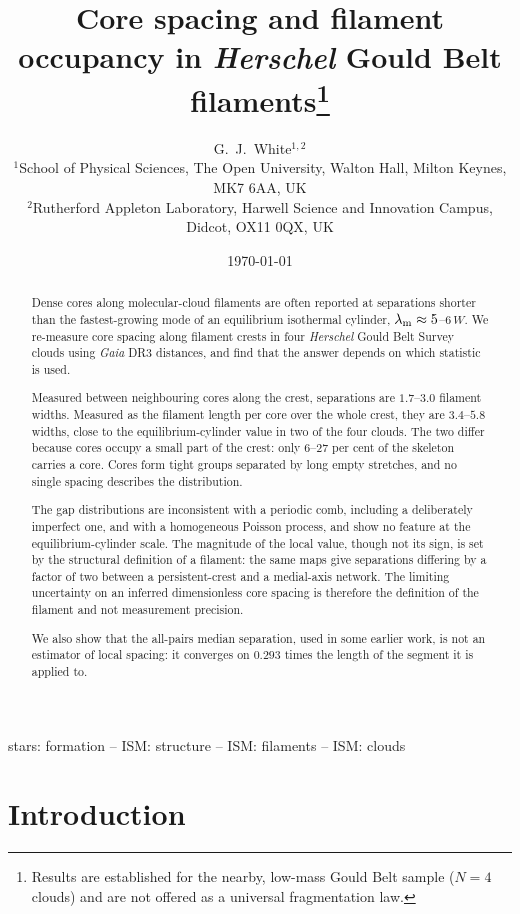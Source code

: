 \documentclass[usenatbib,twoside,twocolumn]{mnras}
\title[Core spacing and filament occupancy in HGBS filaments]{Core spacing and filament occupancy in \textit{Herschel} Gould Belt filaments\thanks{Results are established for the nearby, low-mass Gould Belt sample ($N=4$ clouds) and are not offered as a universal fragmentation law.}}
\author[G.~J.~White]{G.~J.~White$^{1,2}$\\
$^{1}$School of Physical Sciences, The Open University, Walton Hall, Milton Keynes, MK7 6AA, UK\\
$^{2}$Rutherford Appleton Laboratory, Harwell Science and Innovation Campus, Didcot, OX11 0QX, UK}
\date{\today}
\begin{document}
\label{firstpage}
\maketitle

\begin{abstract}

Dense cores along molecular-cloud filaments are often reported at separations shorter than the fastest-growing mode of an equilibrium isothermal cylinder, $\lambda_{\rm m}\approx5$--$6\,W$. We re-measure core spacing along filament crests in four \textit{Herschel} Gould Belt Survey clouds using \textit{Gaia} DR3 distances, and find that the answer depends on which statistic is used.

Measured between neighbouring cores along the crest, separations are $1.7$--$3.0$ filament widths. Measured as the filament length per core over the whole crest, they are $3.4$--$5.8$ widths, close to the equilibrium-cylinder value in two of the four clouds. The two differ because cores occupy a small part of the crest: only $6$--$27$ per cent of the skeleton carries a core. Cores form tight groups separated by long empty stretches, and no single spacing describes the distribution.

The gap distributions are inconsistent with a periodic comb, including a deliberately imperfect one, and with a homogeneous Poisson process, and show no feature at the equilibrium-cylinder scale. The magnitude of the local value, though not its sign, is set by the structural definition of a filament: the same maps give separations differing by a factor of two between a persistent-crest and a medial-axis network. The limiting uncertainty on an inferred dimensionless core spacing is therefore the definition of the filament and not measurement precision.

We also show that the all-pairs median separation, used in some earlier work, is not an estimator of local spacing: it converges on $0.293$ times the length of the segment it is applied to.

\end{abstract}

\begin{keywords}
stars: formation -- ISM: structure -- ISM: filaments -- ISM: clouds
\end{keywords}

\section{Introduction}
\label{sec:intro}
\end{document}
